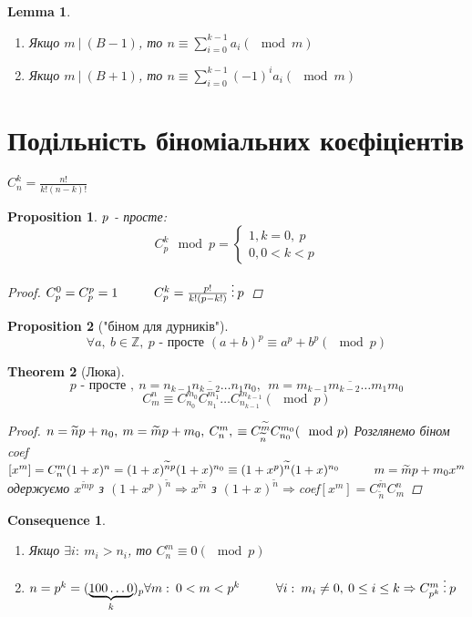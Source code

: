 \documentclass[a4paper,12pt]{bookest}
\newtheorem{theorem}{Theorem}[section]
\newtheorem{lemma}[theorem]{Lemma}
\newtheorem*{prop*}{Proposition}
\newtheorem*{cons*}{Consequence}
\newcommand\tab[1][1cm]{\hspace*{#1}}
\begin{document}
\begin{lemma}$ $
	\begin{enumerate}
		\item Якщо $m\>|\>(B-1)$, то $n\equiv\sum\limits_{i=0}^{k-1}a_i(\mod m)$
		\item Якщо $m\>|\>(B+1)$, то $n\equiv\sum\limits_{i=0}^{k-1}(-1)^ia_i(\mod m)$
	\end{enumerate}
\end{lemma}
\section{Подільність біноміальних коєфіціентів}
$C_n^k=\frac{n!}{k!(n-k)!}$
\begin{prop*}
	$\\p$ - просте: $$C_p^k\mod p=\begin{cases}
		1, k=0,\>p\\0, 0<k<p
	\end{cases}$$
	\begin{proof}
		$\\C_p^0=C_p^p=1\tab C^k_p=\frac{p!}{k!(p-k!)}\>\vdots\>p$
	\end{proof}
\end{prop*}
\begin{prop*}["біном для дурників"]
	$$\forall a,\>b\in\mathbb{Z},\> p\textrm{ - просте }(a+b)^p\equiv a^p+b^p(\mod p)$$
\end{prop*}
\begin{theorem}[Люка]
	$$ p\textrm{ - просте },\>n=\overline{n_{k-1}n_{k-2}\dots n_1n_0},\>\>m=\overline{m_{k-1}m_{k-2}\dots m_1m_0}$$
	$$C_m^n\equiv C^{m_0}_{n_0}C^{m_1}_{n_1}\dots C^{m_{k-1}}_{n_{k-1}}(\mod p)$$
	\begin{proof}
		$\\n=\widetilde{n}p+n_0,\>m=\widetilde{m}p+m_0,\>C^{m}_{n},\>\equiv C^{\widetilde{m}}_{\widetilde{n}}C^{m_0}_{n_0}(\mod p)\\$ Розглянемо біном \tab coef$[x^m]=C^m_n\\(1+x)^n=(1+x)^{\widetilde{n}p}(1+x)^{n_0}\equiv (1+x^p)^{\widetilde{n}}(1+x)^{n_0}\tab m=\widetilde{m}p+m_0\\x^m$ одержуємо $x^{\widetilde{m}p}$ з $(1+x^p)^{\widetilde{n}}\Rightarrow x^{\widetilde{m}}$ з $(1+x)^{\widetilde{n}}\Rightarrow$coef$[x^m]=C^{\widetilde{m}}_{\widetilde{n}}C_m^n$ 
	\end{proof}
\end{theorem}\newpage
\begin{cons*}$ $
	\begin{enumerate}
		\item Якщо $\exists i:\>m_i>n_i$, то $C_n^m\equiv 0(\mod p)$
		\item $n=p^k=(\underbrace{100\dots0}_{k})_p\\\forall m:\>0<m<p^k\tab \forall i:\>m_i\ne 0,\>0\leq i\leq k\Rightarrow C_{p^k}^{m}\>\vdots\>p$
	\end{enumerate}
\end{cons*}
\end{document}
